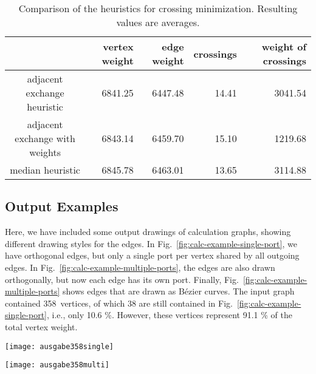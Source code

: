 \documentclass[]{llncs}
\begin{document}
\begin{table}
  \centering
    \begin{tabular}{|c|r|r|r|r|}
    \hline
    ~& vertex weight & edge weight & crossings & weight of crossings \\
    \hline
    adjacent exchange heuristic & 6841.25 & 6447.48  & 14.41 & 3041.54 \\
    adjacent exchange with weights & 6843.14 & 6459.70 & 15.10 & 1219.68 \\
    median heuristic & 6845.78 & 6463.01 & 13.65 & 3114.88 \\
    \hline
    \end{tabular}

  \smallskip

	\caption{Comparison of the heuristics for crossing minimization.
	Resulting values are averages.}
  \label{tab:krMin}
\end{table}



\subsection{Output Examples}
\label{app:calc-examples}

Here, we have included some output drawings of calculation graphs,
showing different drawing styles for the edges. In
Fig.~\ref{fig:calc-example-single-port}, we have orthogonal edges, but
only a single port per vertex shared by all outgoing edges. In
Fig.~\ref{fig:calc-example-multiple-ports}, the edges are also drawn
orthogonally, but now each edge has its own port. Finally,
Fig.~\ref{fig:calc-example-multiple-ports} shows edges that are drawn
as B\'ezier curves. The input graph contained 358~vertices, of which
38 are still contained in Fig.~\ref{fig:calc-example-single-port},
i.e., only 10.6 \%. However, these vertices represent 91.1 \% of the
total vertex weight.

\begin{sidewaysfigure}[htbp]
\centering
  \texttt{[image: ausgabe358single]}
  \caption{Orthogonal edges with a single port per vertex.}
	\label{fig:calc-example-single-port}
\end{sidewaysfigure}

\begin{sidewaysfigure}[htbp]
\centering
  \texttt{[image: ausgabe358multi]}
  \caption{Orthogonal edges with an own port for each outgoing edge.}
	\label{fig:calc-example-multiple-ports}
\end{sidewaysfigure}
\end{document}
